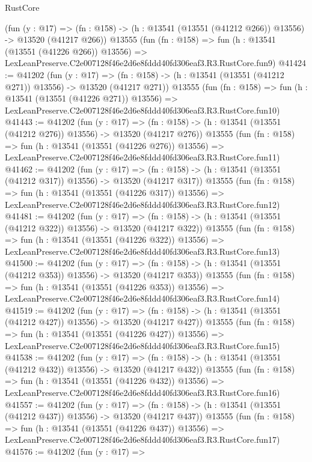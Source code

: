 \begin{lexlean}{RustCore}
\begin{coremodule}
    (fun (y : @17) =>
    (fn : @158) -> (h : @13541 (@13551 (@41212 @266)) @13556) -> @13520 (@41217 @266))
    @13555
    (fun (fn : @158) =>
    fun (h : @13541 (@13551 (@41226 @266)) @13556) =>
    LexLeanPreserve.C2e007128f46e2d6e8fddd40fd306eaf3.R3.RustCore.fun9)
@41424 := @41202
    (fun (y : @17) =>
    (fn : @158) -> (h : @13541 (@13551 (@41212 @271)) @13556) -> @13520 (@41217 @271))
    @13555
    (fun (fn : @158) =>
    fun (h : @13541 (@13551 (@41226 @271)) @13556) =>
    LexLeanPreserve.C2e007128f46e2d6e8fddd40fd306eaf3.R3.RustCore.fun10)
@41443 := @41202
    (fun (y : @17) =>
    (fn : @158) -> (h : @13541 (@13551 (@41212 @276)) @13556) -> @13520 (@41217 @276))
    @13555
    (fun (fn : @158) =>
    fun (h : @13541 (@13551 (@41226 @276)) @13556) =>
    LexLeanPreserve.C2e007128f46e2d6e8fddd40fd306eaf3.R3.RustCore.fun11)
@41462 := @41202
    (fun (y : @17) =>
    (fn : @158) -> (h : @13541 (@13551 (@41212 @317)) @13556) -> @13520 (@41217 @317))
    @13555
    (fun (fn : @158) =>
    fun (h : @13541 (@13551 (@41226 @317)) @13556) =>
    LexLeanPreserve.C2e007128f46e2d6e8fddd40fd306eaf3.R3.RustCore.fun12)
@41481 := @41202
    (fun (y : @17) =>
    (fn : @158) -> (h : @13541 (@13551 (@41212 @322)) @13556) -> @13520 (@41217 @322))
    @13555
    (fun (fn : @158) =>
    fun (h : @13541 (@13551 (@41226 @322)) @13556) =>
    LexLeanPreserve.C2e007128f46e2d6e8fddd40fd306eaf3.R3.RustCore.fun13)
@41500 := @41202
    (fun (y : @17) =>
    (fn : @158) -> (h : @13541 (@13551 (@41212 @353)) @13556) -> @13520 (@41217 @353))
    @13555
    (fun (fn : @158) =>
    fun (h : @13541 (@13551 (@41226 @353)) @13556) =>
    LexLeanPreserve.C2e007128f46e2d6e8fddd40fd306eaf3.R3.RustCore.fun14)
@41519 := @41202
    (fun (y : @17) =>
    (fn : @158) -> (h : @13541 (@13551 (@41212 @427)) @13556) -> @13520 (@41217 @427))
    @13555
    (fun (fn : @158) =>
    fun (h : @13541 (@13551 (@41226 @427)) @13556) =>
    LexLeanPreserve.C2e007128f46e2d6e8fddd40fd306eaf3.R3.RustCore.fun15)
@41538 := @41202
    (fun (y : @17) =>
    (fn : @158) -> (h : @13541 (@13551 (@41212 @432)) @13556) -> @13520 (@41217 @432))
    @13555
    (fun (fn : @158) =>
    fun (h : @13541 (@13551 (@41226 @432)) @13556) =>
    LexLeanPreserve.C2e007128f46e2d6e8fddd40fd306eaf3.R3.RustCore.fun16)
@41557 := @41202
    (fun (y : @17) =>
    (fn : @158) -> (h : @13541 (@13551 (@41212 @437)) @13556) -> @13520 (@41217 @437))
    @13555
    (fun (fn : @158) =>
    fun (h : @13541 (@13551 (@41226 @437)) @13556) =>
    LexLeanPreserve.C2e007128f46e2d6e8fddd40fd306eaf3.R3.RustCore.fun17)
@41576 := @41202
    (fun (y : @17) =>

\end{coremodule}
\end{lexlean}
